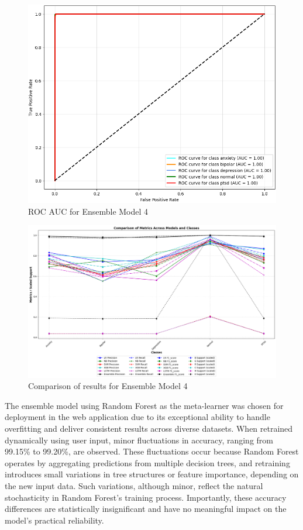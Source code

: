 \begin{figure}[h!]  
    \centering
    \includegraphics[width=1.0\textwidth]{Images/EM RF ROC.png}  
    \caption{ROC AUC for Ensemble Model 4}
    \label{dfdl1244883}  %
\end{figure}

\begin{figure}[h!]  
    \centering
    \includegraphics[width=1.0\textwidth]{Images/EM RF RESULT.png}  
    \caption{Comparison of results for Ensemble Model 4}
    \label{dfdl1244883}  %
\end{figure}

\pagebreak

\noindent
The ensemble model using Random Forest as the meta-learner was chosen for deployment in the web application due to its exceptional ability to handle overfitting and deliver consistent results across diverse datasets. When retrained dynamically using user input, minor fluctuations in accuracy, ranging from 99.15\% to 99.20\%, are observed. These fluctuations occur because Random Forest operates by aggregating predictions from multiple decision trees, and retraining introduces small variations in tree structures or feature importance, depending on the new input data. Such variations, although minor, reflect the natural stochasticity in Random Forest’s training process. Importantly, these accuracy differences are statistically insignificant and have no meaningful impact on the model's practical reliability.

